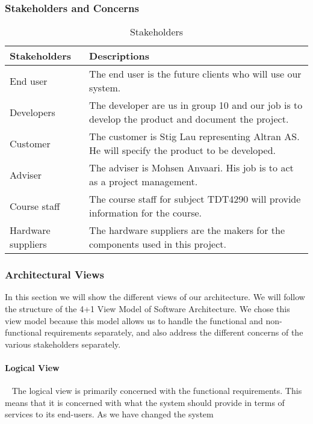 \documentclass[../document]{subfiles}
\begin{document}
\subsubsection{Stakeholders and Concerns}
\begin{table}[H]
	\caption{Stakeholders}
	\begin{tabularx}{\textwidth}{|X|X|}
		\hline
		\textbf{Stakeholders}	& \textbf{Descriptions} \\ \hline
		End user				& The end user is the future clients who will use our system.  \\ \hline
		Developers				& The developer are us in group 10 and our job is to develop the product and document the project.  \\ \hline
		Customer				& The customer is Stig Lau representing \gls{Altran} AS. He will specify the product to be developed.  \\ \hline
		Adviser					& The adviser is Mohsen Anvaari. His job is to act as a project management.  \\ \hline
		Course staff			& The course staff for subject TDT4290 will provide information for the course.  \\ \hline
		Hardware suppliers		& The hardware suppliers are the makers for the components used in this project.  \\ \hline
	\end{tabularx}
\end{table}

\subsubsection{Architectural Views}
In this section we will show the different views of our architecture. We will follow the structure of the 4+1 View Model of Software Architecture. We chose this view model because this model allows us to handle the functional and non-functional requirements separately, and also address the different concerns of the various stakeholders separately.

\paragraph{Logical View} \ \newline				
The logical view is primarily concerned with the functional requirements. This means that it is concerned with what the system should provide in terms of services to its end-users. As we have changed the system 
\end{document}

